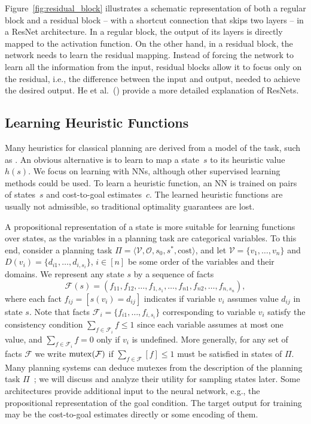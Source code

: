 Figure~\ref{fig:residual_block} illustrates a schematic representation of both a regular block and a residual block -- with a shortcut connection that skips two layers -- in a ResNet architecture. In a regular block, the output of its layers is directly mapped to the activation function. On the other hand, in a residual block, the network needs to learn the residual mapping. Instead of forcing the network to learn all the information from the input, residual blocks allow it to focus only on the residual, i.e., the difference between the input and output, needed to achieve the desired output. He et al.~(\citeyear{He.etal/2016}) provide a more detailed explanation of ResNets.

\subsection{Learning Heuristic Functions}
\label{sec:background_learningheuristics}

Many heuristics for classical planning are derived from a model of the task, such as \sas. An obvious alternative is to learn to map a state~$s$ to its heuristic value~$h(s)$. We focus on learning with NNs, although other supervised learning methods could be used. To learn a heuristic function, an NN is trained on pairs of states~$s$ and cost-to-goal estimates~$c$. The learned heuristic functions are usually not admissible, so traditional optimality guarantees are lost.

A propositional representation of a state is more suitable for learning functions over states, as the variables in a planning task are categorical variables. To this end, consider a planning task $\Pi=\langle\mathcal{V},\mathcal{O},s_0,s^*, \text{cost}\rangle$, and let $\mathcal{V}=\{v_1,\ldots,v_n\}$ and $D(v_i)=\{d_{i1},\ldots,d_{i,s_i}\}$, $i\in[n]$ be some order of the variables and their domains. We represent any state $s$ by a sequence of facts $$\mathcal{F}(s)=(f_{11},f_{12},\ldots,f_{1,s_1},\ldots,f_{n1},f_{n2},\ldots,f_{n,s_n}),$$ where each fact $f_{ij}=[s(v_i)=d_{ij}]$ indicates if variable $v_i$ assumes value $d_{ij}$ in state $s$. Note that facts $\mathcal{F}_i=\{f_{i1},\ldots,f_{i,s_i}\}$ corresponding to variable $v_i$ satisfy the consistency condition $\sum_{f\in \mathcal{F}_i} f\leq 1$ since each variable assumes at most one value, and $\sum_{f\in \mathcal{F}_i} f=0$ only if $v_i$ is undefined. More generally, for any set of facts $\mathcal{F}$ we write $\operatorname{mutex}(\mathcal{F})$ if $\sum_{f\in \mathcal{F}} [f]\leq 1$ must be satisfied in states of $\Pi$. Many planning systems can deduce mutexes from the description of the planning task $\Pi$~\cite{Helmert/2009}; we will discuss and analyze their utility for sampling states later. Some architectures provide additional input to the neural network, e.g., the propositional representation of the goal condition. The target output for training may be the cost-to-goal estimates directly or some encoding of them.

